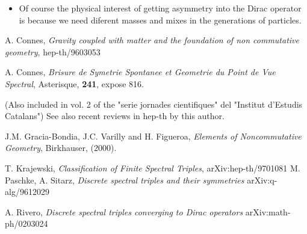 \documentclass[a4paper,10pt]{article}
\begin{document}
\begin{itemize}
\item Of course the physical interest of getting asymmetry into the
Dirac operator is because we need diferent masses and mixes in the
generations of particles.

\end{itemize}
 

\begin{thebibliography}{20}


A. Connes, {\it Gravity coupled with matter and the foundation of
non commutative geometry}, hep-th/9603053

A. Connes, {\it Brisure de Symetrie Spontanee et Geometrie du Point de Vue
Spectral}, Asterisque, {\bf 241}, expose 816.

(Also included in vol. 2 of the "serie jornades cientifiques" del "Institut 
d'Estudis Catalans")
See also recent reviews in hep-th by this author.

J.M. Gracia-Bondia, J.C. Varilly and H. Figueroa, {\it Elements of
Noncommutative Geometry}, Birkhauser, (2000).

T. Krajewski, {\it Classification of Finite Spectral Triples},
arXiv:hep-th/9701081
M. Paschke, A. Sitarz, {\it Discrete spectral triples and their 
symmetries} arXiv:q-alg/9612029

A. Rivero, {\it Discrete spectral triples converging to Dirac operators}
 arXiv:math-ph/0203024



\end{thebibliography}
\end{document}
